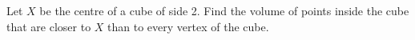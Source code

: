 Let $X$ be the centre of a cube of side 2. Find the volume of points inside the cube that are closer to $X$ than to every vertex of the cube.

